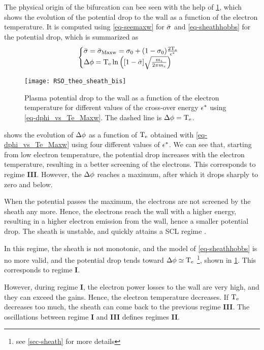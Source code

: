    
   The physical origin of the bifurcation can bee seen with the help of \cref{fig-dphivsTe}, which shows the evolution of the potential drop to the wall as a function of the electron temperature.
   It is computed using \cref{eq-seemaxw} for $ \bar{\sigma }$ and \cref{eq-sheathhobbs} for the potential drop, which is summarized as 
   \begin{equation} \label{eq-dphi_vs_Te_Maxw}
     \begin{cases}
        \bar{\sigma } =  \bar{\sigma }_{\rm Maxw} = \sigma _0 + (1- \sigma _0) \frac{2 \mathrm{T_e}}{\epsilon^{*}} \\
       \Delta \phi = \mathrm{T_e} \ln \left( [1 -  \bar{\sigma }] \sqrt{ \frac{m_i}{2 \pi m_e}}  \right)
     \end{cases}
   \end{equation}

   \begin{figure}[hbtp]
     \centering
     \texttt{[image: RSO\_theo\_sheath\_bis]}
     \caption{Plasma potential drop to the wall as a function of the electron temperature for different values of the cross-over energy $\epsilon^{*}$ using \cref{eq-dphi_vs_Te_Maxw}. The dashed line is $\Delta \phi=\mathrm{T_e}$. }
     \label{fig-dphivsTe}
   \end{figure}
   
    shows the evolution of $\Delta \phi$ as a function of $\mathrm{T_e}$ obtained with \cref{eq-dphi_vs_Te_Maxw} using four different values of $\epsilon^{*}$. 
   We can see that, starting from low electron temperature, the potential drop increases with the electron temperature, resulting in a better screening of the electrons.
   This corresponds to regime {\bf III}.
   However, the $\Delta \phi$ reaches a maximum, after which it drops sharply to zero and below.
   
   When the potential passes the maximum, the electrons are not screened by the sheath any more.
   Hence, the electrons reach the wall with a higher energy, resulting in a higher electron emission from the wall, hence a smaller potential drop.
   The sheath is unstable, and quickly attains a \ac{SCL} regime \citep{raitses2005}.
   
   In this regime, the sheath is not monotonic, and the model of \cref{eq-sheathhobbs} is no more valid, and the potential drop tends toward $\Delta \phi \simeq \mathrm{T_e}$ \citep{hobbs1967,goebel2008} \footnote{see \cref{sec-sheath} for more details}, shown in \cref{fig-dphivsTe}.
   This corresponds to regime {\bf I}.
   
   However, during regime {\bf I}, the electron power losses to the wall are very high, and they can exceed the gains.
   Hence, the electron temperature decreases.
   If $\mathrm{T_e}$ decreases too much, the sheath can come back to the previous regime {\bf III}.
   The oscillations between regime {\bf I} and {\bf III} defines regimes {\bf II}.
      
